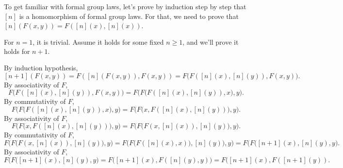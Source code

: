 \vspace{3mm}

To get familiar with formal group laws, let's prove by induction step by step that $[n]$ is a homomorphism of formal group laws. For that, we need to prove that $[n](F(x,y))=F([n](x),[n](x))$.

For $n=1$, it is trivial. Assume it holds for some fixed $n\geq1$, and we'll prove it holds for $n+1$.

By induction hypothesis,
\[[n+1](F(x,y))=F([n](F(x,y)),F(x,y))=F\big(F([n](x),[n](y)),F(x,y)\big).\]
By associativity of $F$,
\[F\big(F([n](x),[n](y)),F(x,y)\big)=F\big(F\big(F([n](x),[n](y)),x\big),y\big).\]
By commutativity of $F$,
\[F\big(F\big(F([n](x),[n](y)),x\big),y\big)=F\big(F\big(x,F([n](x),[n](y))\big),y\big).\]
By associativity of $F$,
\[F\big(F\big(x,F([n](x),[n](y))\big),y\big)=F\big(F\big(F(x,[n](x)),[n](y)\big),y\big).\]
By commutativity of $F$,
\[F\big(F\big(F(x,[n](x)),[n](y)\big),y\big)=F\big(F\big(F([n](x),x)),[n](y)\big),y\big)=F\big(F([n+1](x),[n](y),y\big).\]
By associativity of $F$,
\[F\big(F([n+1](x),[n](y),y\big)=F\big([n+1](x),F([n](y),y)\big)=F([n+1](x),F([n+1](y)).\]
\hfill\qedsymbol
